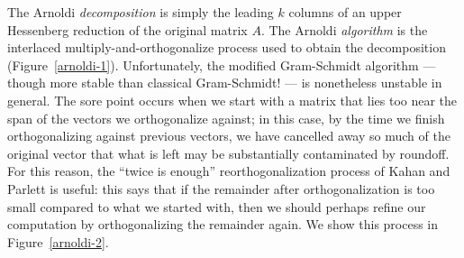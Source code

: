 The Arnoldi {\em decomposition} is simply the leading $k$ columns of an
upper Hessenberg reduction of the original matrix $A$.  The Arnoldi
{\em algorithm} is the interlaced multiply-and-orthogonalize process
used to obtain the decomposition (Figure~\ref{arnoldi-1}).
Unfortunately, the modified Gram-Schmidt algorithm --- though more
stable than classical Gram-Schmidt! --- is nonetheless unstable in
general.  The sore point occurs when we start with a matrix that lies
too near the span of the vectors we orthogonalize against; in this case,
by the time we finish orthogonalizing against previous vectors, we have
cancelled away so much of the original vector that what is left may be
substantially contaminated by roundoff.  For this reason, the
``twice is enough'' reorthogonalization process of Kahan and Parlett
is useful: this says that if the remainder after orthogonalization is
too small compared to what we started with, then we should perhaps
refine our computation by orthogonalizing the remainder again.
We show this process in Figure~\ref{arnoldi-2}.
